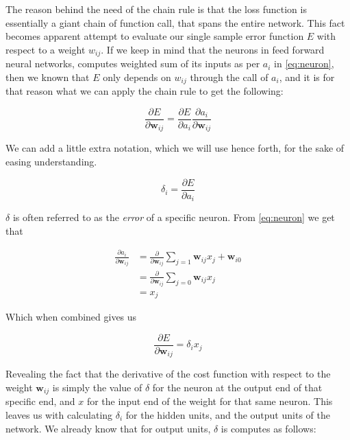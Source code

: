 The reason behind the need of the chain rule is that the loss function is
essentially a giant chain of function call, that spans the entire network. This
fact becomes apparent attempt to evaluate our single sample error function $E$
with respect to a weight $w_{ij}$. If we keep in mind that the neurons in feed
forward neural networks, computes weighted sum of its inputs as per $a_i$ in
\eqref{eq:neuron}, then we known that $E$ only depends on $w_{ij}$ through the
call of $a_i$, and it is for that reason what we can apply the chain rule to get
the following:

\begin{equation}
\frac{\partial E}{\partial \mathbf{w}_{ij}} = \frac{\partial E}{\partial a_i}
\frac{\partial a_i}{\partial \mathbf{w}_{ij}}
\end{equation}

We can add a little extra notation, which we will use hence forth, for the
sake of easing understanding.

\begin{equation}\label{eq:delta}
\delta_i = \frac{\partial E}{\partial a_i}
\end{equation}

$\delta$ is often referred to as the \textit{error} of a specific neuron.
From \eqref{eq:neuron} we get that

\begin{align}
\frac{\partial a_i}{\partial \mathbf{w}_{ij}} &= \frac{\partial}{\partial \mathbf{w}_{ij}}
\sum_{j=1} \mathbf{w}_{ij} x_j + \mathbf{w}_{i0}\\
&= \frac{\partial}{\partial \mathbf{w}_{ij}} \sum_{j = 0} \mathbf{w}_{ij} x_j\\
&= x_j
\end{align}

Which when combined gives us

\begin{equation}
\label{eq:deriv}
\frac{\partial E}{\partial \mathbf{w}_{ij}} = \delta_i x_j
\end{equation}

Revealing the fact that the derivative of the cost function with respect to the
weight $\mathbf{w}_{ij}$ is simply the value of $\delta$ for the neuron at the
output end of that specific end, and $x$ for the input end of the weight for
that same neuron. This leaves us with calculating $\delta_i$ for the hidden
units, and the output units of the network. We already know that for output
units, $\delta$ is computes as follows:


